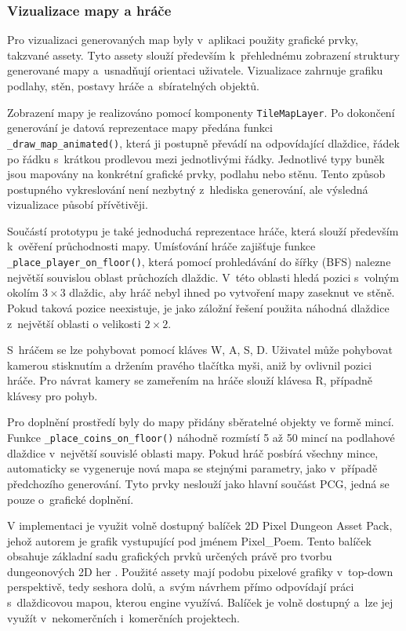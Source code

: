 \documentclass[
   program=itk,
   biblatex,
   figures=true,
   tables=true,
   glossaries,
   index
]{kidiplom}
\begin{document}
\subsubsection{Vizualizace mapy a hráče}

Pro vizualizaci generovaných map byly v~aplikaci použity grafické prvky, takzvané assety. Tyto assety slouží především k~přehlednému zobrazení struktury generované mapy a~usnadňují orientaci uživatele. Vizualizace zahrnuje grafiku podlahy, stěn, postavy hráče a~sbíratelných objektů.

Zobrazení mapy je realizováno pomocí komponenty \texttt{TileMapLayer}. Po dokončení generování je datová reprezentace mapy předána funkci \\\texttt{\_draw\_map\_animated()}, která ji postupně převádí na odpovídající dlaždice, řádek po řádku s~krátkou prodlevou mezi jednotlivými řádky. Jednotlivé typy buněk jsou mapovány na konkrétní grafické prvky, podlahu nebo stěnu. Tento způsob postupného vykreslování není nezbytný z~hlediska generování, ale výsledná vizualizace působí přívětivěji.

Součástí prototypu je také jednoduchá reprezentace hráče, která slouží především k~ověření průchodnosti mapy. Umísťování hráče zajišťuje funkce \\ \texttt{\_place\_player\_on\_floor()}, která pomocí prohledávání do šířky (BFS) nalezne největší souvislou oblast průchozích dlaždic. V~této oblasti hledá pozici s~volným okolím $3 \times 3$ dlaždic, aby hráč nebyl ihned po vytvoření mapy zaseknut ve stěně. Pokud taková pozice neexistuje, je jako záložní řešení použita náhodná dlaždice z~největší oblasti o velikosti $2 \times 2$.

S~hráčem se lze pohybovat pomocí kláves W, A, S, D. Uživatel může pohybovat kamerou stisknutím a držením pravého tlačítka myši, aniž by ovlivnil pozici hráče. Pro návrat kamery se zameřením na hráče slouží klávesa R, případně klávesy pro pohyb.

Pro doplnění prostředí byly do mapy přidány sběratelné objekty ve formě mincí. Funkce \texttt{\_place\_coins\_on\_floor()} náhodně rozmístí 5 až 50 mincí na podlahové dlaždice v~největší souvislé oblasti mapy. Pokud hráč posbírá všechny mince, automaticky se vygeneruje nová mapa se stejnými parametry, jako v~případě předchozího generování. Tyto prvky neslouží jako hlavní součást PCG, jedná se pouze o~grafické doplnění.

V implementaci je využit volně dostupný balíček 2D Pixel Dungeon Asset Pack, jehož autorem je grafik vystupující pod jménem Pixel\_Poem. Tento balíček obsahuje základní sadu grafických prvků určených právě pro tvorbu dungeonových 2D her \cite{pixel_dungeon_asset}. Použité assety mají podobu pixelové grafiky v~top-down perspektivě, tedy seshora dolů, a~svým návrhem přímo odpovídají práci s~dlaždicovou mapou, kterou engine využívá. Balíček je volně dostupný a~lze jej využít v~nekomerčních i~komerčních projektech.
\end{document}
